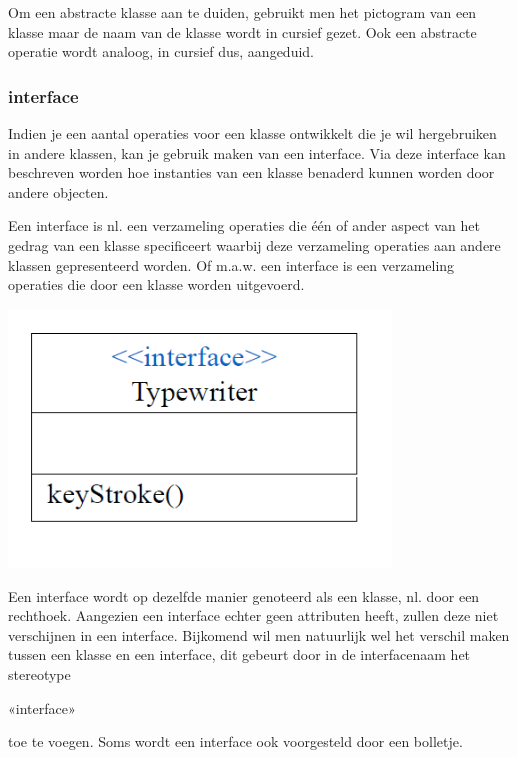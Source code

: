 Om een abstracte klasse aan te duiden, gebruikt men het pictogram van een klasse maar de naam van de klasse wordt in cursief gezet. Ook een abstracte operatie wordt analoog, in cursief dus, aangeduid.

\subsubsection{interface}

Indien je een aantal operaties voor een klasse ontwikkelt die je wil hergebruiken in andere klassen, kan je gebruik maken van een interface. Via deze interface kan beschreven worden hoe instanties van een klasse benaderd kunnen worden door andere objecten.

Een interface is nl. een verzameling operaties die één of ander aspect van het gedrag van een klasse specificeert waarbij deze verzameling operaties aan andere klassen gepresenteerd worden.
Of m.a.w. een interface is een verzameling operaties die door een klasse worden uitgevoerd.


\begin{center}
\includegraphics[width=4in]{img/int1}%
\end{center}

Een interface wordt op dezelfde manier genoteerd als een klasse, nl. door een rechthoek. Aangezien een interface echter geen attributen heeft, zullen deze niet verschijnen in een interface.
Bijkomend wil men natuurlijk wel het verschil maken tussen een klasse en een interface, dit gebeurt door in de interfacenaam het stereotype

\begin{center}
«interface»
\end{center}

toe te voegen. Soms wordt een interface ook voorgesteld door een bolletje.

